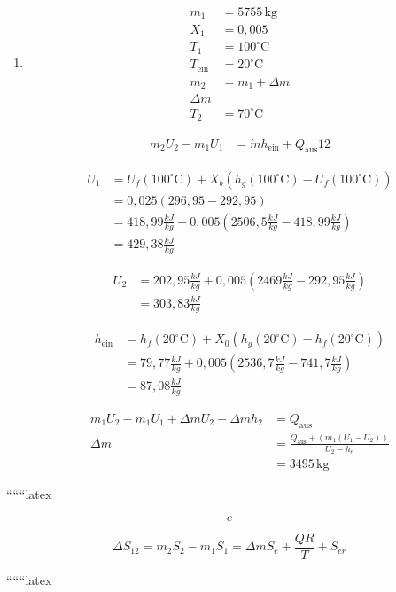 \begin{enumerate}
    \item 
    \begin{align*}
        m_1 &= 5755 \, \text{kg} \\
        X_1 &= 0{,}005 \\
        T_1 &= 100^\circ \text{C} \\
        T_{\text{ein}} &= 20^\circ \text{C} \\
        m_2 &= m_1 + \Delta m \\
        \Delta m \\
        T_2 &= 70^\circ \text{C}
    \end{align*}
    
    \begin{align*}
        m_2 U_2 - m_1 U_1 &= \dot{m} h_{\text{ein}} + Q_{\text{aus}} 12
    \end{align*}
    
    
    \begin{align*}
        U_1 &= U_f (100^\circ \text{C}) + X_b \left( h_g (100^\circ \text{C}) - U_f (100^\circ \text{C}) \right) \\
        &= 0{,}025 (296{,}95 - 292{,}95) \\
        &= 418{,}99 \frac{kJ}{kg} + 0{,}005 (2506{,}5 \frac{kJ}{kg} - 418{,}99 \frac{kJ}{kg}) \\
        &= 429{,}38 \frac{kJ}{kg}
    \end{align*}
    
    
    \begin{align*}
        U_2 &= 202{,}95 \frac{kJ}{kg} + 0{,}005 (2469 \frac{kJ}{kg} - 292{,}95 \frac{kJ}{kg}) \\
        &= 303{,}83 \frac{kJ}{kg}
    \end{align*}
    
    
    \begin{align*}
        h_{\text{ein}} &= h_f (20^\circ \text{C}) + X_0 (h_g (20^\circ \text{C}) - h_f (20^\circ \text{C})) \\
        &= 79{,}77 \frac{kJ}{kg} + 0{,}005 (2536{,}7 \frac{kJ}{kg} - 741{,}7 \frac{kJ}{kg}) \\
        &= 87{,}08 \frac{kJ}{kg}
    \end{align*}
    
    \begin{align*}
        m_1 U_2 - m_1 U_1 + \Delta m U_2 - \Delta m h_2 &= Q_{\text{aus}} \\
        \Delta m &= \frac{Q_{\text{aus}} + (m_1 (U_1 - U_2))}{U_2 - h_e} \\
        &= 3495 \, \text{kg}
    \end{align*}
\end{enumerate}

``````latex


\[ 
e 
\]

\[
\Delta S_{12} = m_2 S_2 - m_1 S_1 = \Delta m S_e + \frac{QR}{T} + S_{er}
\]

``````latex


